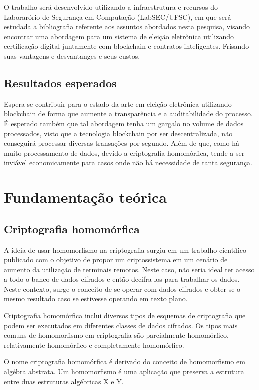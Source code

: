 \documentclass{ufsctex/ufsctex}
\begin{document}
O trabalho será desenvolvido utilizando a infraestrutura e recursos do
Laborarório de Segurança em Computação (LabSEC/UFSC), em que será estudada
a bibliografia referente aos assuntos abordados nesta pesquisa, visando
encontrar uma abordagem para um sistema de eleição eletrônica utilizando
certificação digital juntamente com blockchain e contratos inteligentes.
Frisando suas vantagens e desvantanges e seus custos.

\section{Resultados esperados}

Espera-se contribuir para o estado da arte em eleição eletrônica utilizando
blockchain de forma que aumente a transparência e a auditabilidade do
processo. É esperado também que tal abordagem tenha um gargalo no volume de
dados processados, visto que a tecnologia blockchain por ser descentralizada,
não conseguirá processar diversas transações por segundo. Além de que,
como há muito processamento de dados, devido a criptografia homomórfica,
tende a ser inviável economicamente para casos onde não há necessidade de
tanta segurança.

\chapter{Fundamentação teórica}

\section{Criptografia homomórfica}

A ideia de usar homomorfismo na criptografia surgiu em um trabalho científico
publicado com o objetivo de propor um criptossistema em um cenário de aumento da utilização
de terminais remotos. Neste caso, não seria ideal ter acesso a todo o banco de dados
cifrados e então decifra-los para trabalhar os dados. Neste contexto, surge o conceito
de se operar com dados cifrados e obter-se o mesmo resultado caso se estivesse operando em
texto plano.\cite{homomorphic}

Criptografia homomórfica inclui diversos tipos de esquemas de criptografia que podem
ser executados em diferentes classes de dados cifrados. Os tipos mais comuns de homomorfismo
em criptografia são parcialmente homomórfico, relativamente homomórfico e completamente
homomórfico.
\cite{survey-homo}

O nome criptografia homomórfica é derivado do conceito de homomorfismo em
algébra abstrata. Um homomorfismo é uma aplicação que preserva a estrutura
entre duas estruturas algébricas X e Y.
\end{document}
